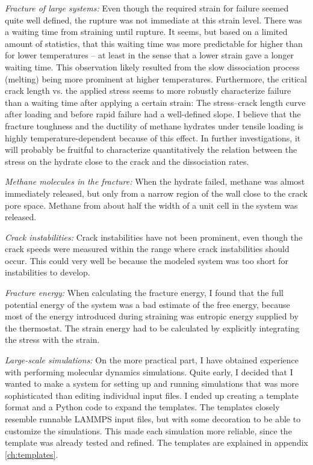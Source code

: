 \textit{Fracture of large systems:} Even though the required strain for failure seemed quite well defined, the rupture was not immediate at this strain level. There was a waiting time from straining until rupture. It seems, but based on a limited amount of statistics, that this waiting time was more predictable for higher than for lower temperatures -- at least in the sense that a lower strain gave a longer waiting time. This observation likely resulted from the slow dissociation process (melting) being more prominent at higher temperatures.  Furthermore, the critical crack length vs. the applied stress seems to more robustly characterize failure than a waiting time after applying a certain strain: The stress--crack length curve after loading and before rapid failure had a well-defined slope. I believe that the fracture toughness and the ductility of methane hydrates under tensile loading is highly temperature-dependent because of this effect. In further investigations, it will probably be fruitful to characterize quantitatively the relation between the stress on the hydrate close to the crack and the dissociation rates. 

\textit{Methane molecules in the fracture:} When the hydrate failed, methane was almost immediately released, but only from a narrow region of the wall close to the crack pore space. Methane from about half the width of a unit cell in the system was released.

\textit{Crack instabilities:} Crack instabilities have not been prominent, even though the crack speeds were measured within the range where crack instabilities should occur. This could very well be because the modeled system was too short for instabilities to develop.

\textit{Fracture energy:} When calculating the fracture energy, I found that the full potential energy of the system was a bad estimate of the free energy, because most of the energy introduced during straining was entropic energy supplied by the thermostat. The strain energy had to be calculated by explicitly integrating the stress with the strain. 

\textit{Large-scale simulations:} On the more practical part, I have obtained experience with performing molecular dynamics simulations. Quite early, I decided that I wanted to make a system for setting up and running simulations that was more sophisticated than editing individual input files. I ended up creating a template format and a Python code to expand the templates. The templates closely resemble runnable LAMMPS input files, but with some decoration to be able to customize the simulations. This made each simulation more reliable, since the template was already tested and refined. The templates are explained in appendix \ref{ch:templates}.


